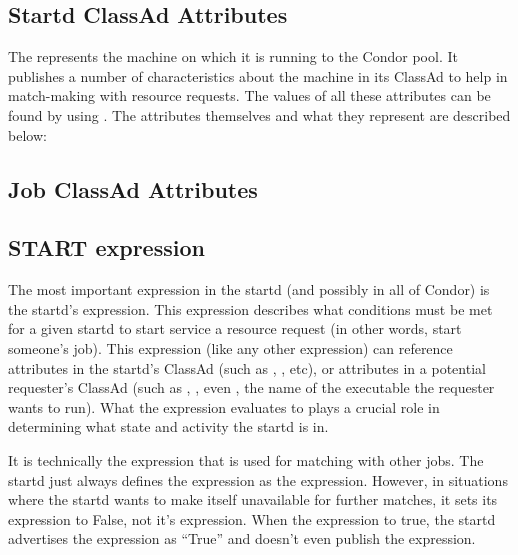 \subsection{Startd ClassAd Attributes}
\label{sec:Startd-Attributes}

The  represents the machine on which it is running to
the Condor pool.  It publishes a number of characteristics about the
machine in its ClassAd to help in match-making with resource requests.
The values of all these attributes can be found by using
.  The attributes themselves and
what they represent are described below:




\subsection{Job ClassAd Attributes}
\label{sec:Job-Attributes}

\Todo

\subsection{ START expression}
\label{sec:Start-Expr}

The most important expression in the startd (and possibly in all of
Condor) is the startd's  expression.  This expression
describes what conditions must be met for a given startd to start
service a resource request (in other words, start someone's job).
This expression (like any other expression) can reference attributes
in the startd's ClassAd (such as , ,
etc), or attributes in a potential requester's ClassAd (such as
, , even , the name of the
executable the requester wants to run).  What the 
expression evaluates to plays a crucial role in determining what state
and activity the startd is in.

It is technically the  expression that is used for
matching with other jobs.  The startd just always defines the
 expression as the  expression.
However, in situations where the startd wants to make itself
unavailable for further matches, it sets its 
expression to False, not it's  expression.  When the
 expression  to true, the startd
advertises the  expression as ``True'' and doesn't
even publish the  expression.

